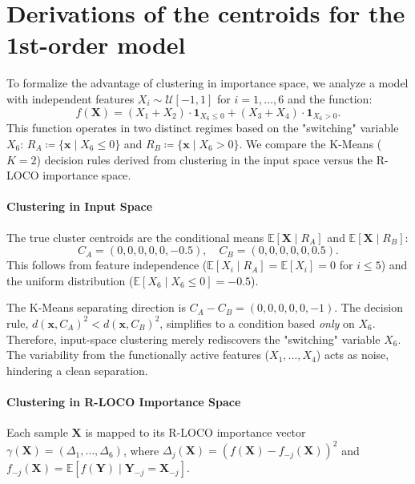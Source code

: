 \documentclass{article}
\theoremstyle{plain}
\theoremstyle{definition}
\theoremstyle{remark}
\begin{document}
\section{Derivations of the centroids for the 1st-order model} \label{proof:centroids}


To formalize the advantage of clustering in importance space, we analyze a model with independent features $X_i \sim \mathcal{U}[-1, 1]$ for $i=1, \dots, 6$ and the function:
\[
f(\mathbf{X}) = (X_1 + X_2) \cdot \mathbf{1}_{X_6 \leq 0} + (X_3 + X_4) \cdot \mathbf{1}_{X_6 > 0}.
\]
This function operates in two distinct regimes based on the "switching" variable $X_6$: $R_A \coloneqq \{ \mathbf{x} \mid X_6 \le 0 \}$ and $R_B \coloneqq \{ \mathbf{x} \mid X_6 > 0 \}$. We compare the K-Means ($K=2$) decision rules derived from clustering in the input space versus the R-LOCO importance space.

\paragraph{Clustering in Input Space}
The true cluster centroids are the conditional means $\mathbb{E}[\mathbf{X} \mid R_A]$ and $\mathbb{E}[\mathbf{X} \mid R_B]$:
\[
C_A = (0, 0, 0, 0, 0, -0.5), \quad
C_B = (0, 0, 0, 0, 0, 0.5).
\]
This follows from feature independence ($\mathbb{E}[X_i \mid R_A] = \mathbb{E}[X_i] = 0$ for $i \le 5$) and the uniform distribution ($\mathbb{E}[X_6 \mid X_6 \le 0] = -0.5$).

The K-Means separating direction is $C_A - C_B = (0, 0, 0, 0, 0, -1)$. The decision rule, $d(\mathbf{x}, C_A)^2 < d(\mathbf{x}, C_B)^2$, simplifies to a condition based \emph{only} on $X_6$. Therefore, input-space clustering merely rediscovers the "switching" variable $X_6$. The variability from the functionally active features ($X_1, \dots, X_4$) acts as noise, hindering a clean separation.

\paragraph{Clustering in R-LOCO Importance Space}
Each sample $\mathbf{X}$ is mapped to its R-LOCO importance vector $\gamma(\mathbf{X}) = (\Delta_1, \ldots, \Delta_6)$, where $\Delta_j(\mathbf{X}) = (f(\mathbf{X}) - f_{-j}(\mathbf{X}))^2$ and $f_{-j}(\mathbf{X}) = \mathbb{E}[f(\mathbf{Y}) \mid \mathbf{Y}_{-j} = \mathbf{X}_{-j}]$.
\end{document}
